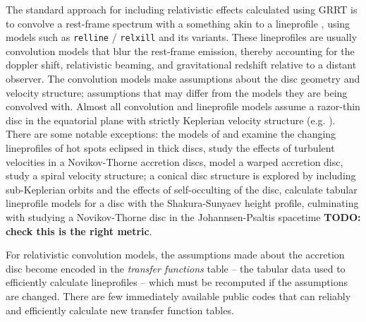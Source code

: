 \documentclass[fleqn,usenatbib]{mnras}
\newcommand{\todo}[1]{{\noindent \bf \color{red} TODO: #1}}
\begin{document}
The standard approach for including relativistic effects calculated using GRRT
is to convolve a rest-frame spectrum with a something akin to a lineprofile
\citep{fabian_x-ray_1989, laor_line_1991}, using models such as \texttt{relline}
/ \texttt{relxill} \citep{dauser_broad_2010, dauser_relativistic_2016}  and its
variants. These lineprofiles are usually convolution models that blur the
rest-frame emission, thereby accounting for the doppler shift, relativistic
beaming, and gravitational redshift relative to a distant observer. The
convolution models make assumptions about the disc geometry and velocity
structure; assumptions that may differ from the models they are being convolved
with. Almost all convolution and lineprofile models assume a razor-thin
disc in the equatorial plane with strictly Keplerian velocity structure (e.g.
\citealt{dovciak_extended_2004, beckwith_iron_2004, brenneman_constraining_2006,
dauser_broad_2010}).
There are some notable exceptions:
the models of \cite{karas_light_1992} and \cite{karas_vicinity_1992} examine the
changing lineprofiles of hot spots
eclipsed in thick discs, \cite{pariev_line_1998} study the effects of
turbulent velocities in a Novikov-Thorne accretion discs,
\cite{hartnoll_reprocessed_2001} model a warped accretion disc,
\cite{fukumura_iron_2004} study a spiral velocity structure; a conical disc
structure is explored by \cite{wu_iron_2007} including sub-Keplerian orbits and the effects of
self-occulting of the disc,
\cite{taylor_exploring_2018} calculate tabular lineprofile models for a disc
with the
Shakura-Sunyaev height profile, culminating with \cite{abdikamalov_testing_2020}
studying a Novikov-Thorne disc in the Johannsen-Psaltis spacetime  \todo{check
this is the right metric}.

For relativistic convolution models, the assumptions made about the accretion
disc become encoded in the \textit{transfer functions} table -- the tabular data
used to efficiently calculate lineprofiles -- which must be recomputed if the
assumptions are changed. There are few immediately available public codes that
can reliably and efficiently calculate new transfer function tables.
\end{document}
